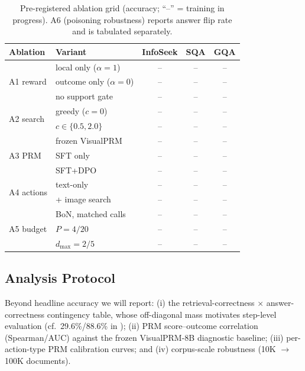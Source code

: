 \documentclass[letterpaper,twocolumn,10pt]{article}
\newcommand{\NA}{--}          %
\begin{document}
\begin{table}[t]
\centering\small
\setlength{\tabcolsep}{3pt}
\begin{tabular}{@{}llccc@{}}
\toprule
Ablation & Variant & InfoSeek & SQA & GQA \\
\midrule
\multirow{3}{*}{A1 reward}
 & local only ($\alpha{=}1$) & \NA & \NA & \NA \\
 & outcome only ($\alpha{=}0$) & \NA & \NA & \NA \\
 & no support gate & \NA & \NA & \NA \\
\midrule
\multirow{2}{*}{A2 search}
 & greedy ($c{=}0$) & \NA & \NA & \NA \\
 & $c \in \{0.5, 2.0\}$ & \NA & \NA & \NA \\
\midrule
\multirow{3}{*}{A3 PRM}
 & frozen VisualPRM & \NA & \NA & \NA \\
 & SFT only & \NA & \NA & \NA \\
 & SFT+DPO & \NA & \NA & \NA \\
\midrule
\multirow{2}{*}{A4 actions}
 & text-only & \NA & \NA & \NA \\
 & + image search & \NA & \NA & \NA \\
\midrule
\multirow{3}{*}{A5 budget}
 & BoN, matched calls & \NA & \NA & \NA \\
 & $P{=}4 / 20$ & \NA & \NA & \NA \\
 & $d_{\max}{=}2 / 5$ & \NA & \NA & \NA \\
\bottomrule
\end{tabular}
\caption{Pre-registered ablation grid (accuracy; ``\NA'' = training in
progress). A6 (poisoning robustness) reports answer flip rate and is
tabulated separately.}
\label{tab:ablations}
\end{table}

\subsection{Analysis Protocol}
Beyond headline accuracy we will report: (i) the retrieval-correctness
$\times$ answer-correctness contingency table, whose off-diagonal mass
motivates step-level evaluation (cf.\ 29.6\%/88.6\% in
\citealt{chen2026learningtosearch}); (ii) PRM score--outcome correlation
(Spearman/AUC) against the frozen VisualPRM-8B diagnostic baseline; (iii)
per-action-type PRM calibration curves; and (iv) corpus-scale robustness
(10K $\rightarrow$ 100K documents).

\end{document}
